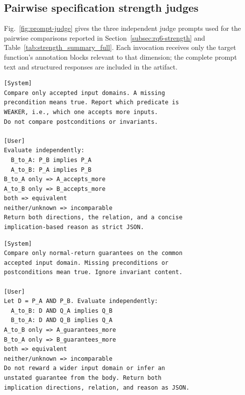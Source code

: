 \subsection{{Pairwise specification strength judges}}
\label{app:prompt-strength-judge}

{Fig.~\ref{fig:prompt-judge} gives the three independent judge prompts used for the pairwise comparisons reported in Section~\ref{subsec:rq6-strength} and Table~\ref{tab:strength_summary_full}. Each invocation receives only the target function's annotation blocks relevant to that dimension; the complete prompt text and structured responses are included in the artifact.}

\par\medskip\noindent
\begin{minipage}[t]{\columnwidth}
\begin{tcolorbox}[promptboxcompact, title={\textcolor{white}{Precondition judge}}, width=\linewidth]
\begin{lstlisting}[style=PromptInnerCompact]
[System]
Compare only accepted input domains. A missing
precondition means true. Report which predicate is
WEAKER, i.e., which one accepts more inputs.
Do not compare postconditions or invariants.

[User]
Evaluate independently:
  B_to_A: P_B implies P_A
  A_to_B: P_A implies P_B
B_to_A only => A_accepts_more
A_to_B only => B_accepts_more
both => equivalent
neither/unknown => incomparable
Return both directions, the relation, and a concise
implication-based reason as strict JSON.
\end{lstlisting}
\end{tcolorbox}
\end{minipage}\par\medskip\noindent
\begin{minipage}[t]{\columnwidth}
\begin{tcolorbox}[promptboxcompact, title={\textcolor{white}{Postcondition judge}}, width=\linewidth]
\begin{lstlisting}[style=PromptInnerCompact]
[System]
Compare only normal-return guarantees on the common
accepted input domain. Missing preconditions or
postconditions mean true. Ignore invariant content.

[User]
Let D = P_A AND P_B. Evaluate independently:
  A_to_B: D AND Q_A implies Q_B
  B_to_A: D AND Q_B implies Q_A
A_to_B only => A_guarantees_more
B_to_A only => B_guarantees_more
both => equivalent
neither/unknown => incomparable
Do not reward a wider input domain or infer an
unstated guarantee from the body. Return both
implication directions, relation, and reason as JSON.
\end{lstlisting}
\end{tcolorbox}
\end{minipage}\par\medskip\noindent
